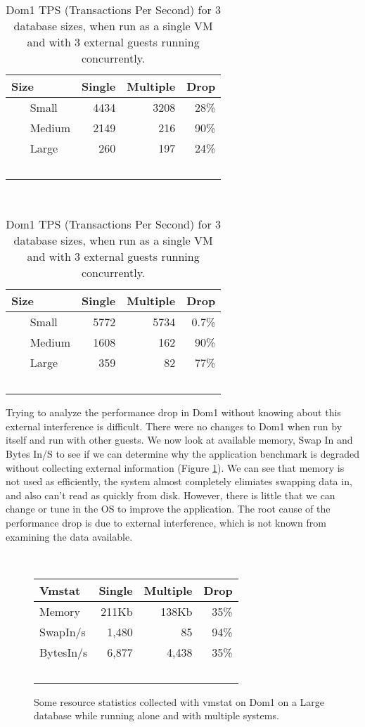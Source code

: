 \begin{table}[h]
\begin{subtable}[h]{0.45\textwidth}
  \begin{tabular}{ l | r | r | r }
    Size & Single & Multiple & Drop \\
    \hline
    Small & 4434 & 3208 & 28\% \\ \hline
    Medium & 2149 & 216 & 90\% \\ \hline
    Large & 260 & 197 & 24\% \\  \hline
    \hline
  \end{tabular}
\caption{Small Server with 2GB RAM:  Each Guest domain has 512MB Allocated.}
\label{fig:tps1}
\end{subtable}
\hfill
\begin{subtable}[h]{0.45\textwidth}
  \begin{tabular}{ l | r | r | r }
    Size & Single & Multiple & Drop \\
    \hline
    Small & 5772 & 5734 & 0.7\% \\ \hline
    Medium & 1608 & 162 & 90\% \\ \hline
    Large & 359 & 82 & 77\% \\  \hline
    \hline
  \end{tabular}
\caption{Medium Server with 8GB RAM:  Each Guest domain has 2GB Allocated. }
\label{fig:tps2}
\end{subtable}
\caption{Dom1 TPS (Transactions Per Second) for 3 database sizes, when run as a single VM and with 3 external guests running concurrently.}
\end{table}

\indent Trying to analyze the performance drop in Dom1 without knowing about this external interference is difficult.  There were no changes to Dom1 when run by itself and run with other guests.  We now look at available memory, Swap In and Bytes In/S to see if we can determine why the application benchmark is degraded without collecting external information (Figure \ref{fig:vmstat}).  We can see that memory is not used as efficiently, the system almost completely elimiates swapping data in, and also can't read as quickly from disk.  However, there is little that we can change or tune in the OS to improve the application.  The root cause of the performance drop is due to external interference, which is not known from examining the data available.
\begin{figure}
  \begin{tabular}{ l | r | r | r }
    Vmstat & Single & Multiple & Drop \\ \hline
	Memory & 211Kb & 138Kb & 35\% \\
	SwapIn/s & 1,480 & 85 & 94\% \\
	BytesIn/s & 6,877 & 4,438 & 35\% \\
  \end{tabular}
\caption{Some resource statistics collected with vmstat on Dom1 on a Large database while running alone and with multiple systems.} 
\label{fig:vmstat}
\end{figure}

